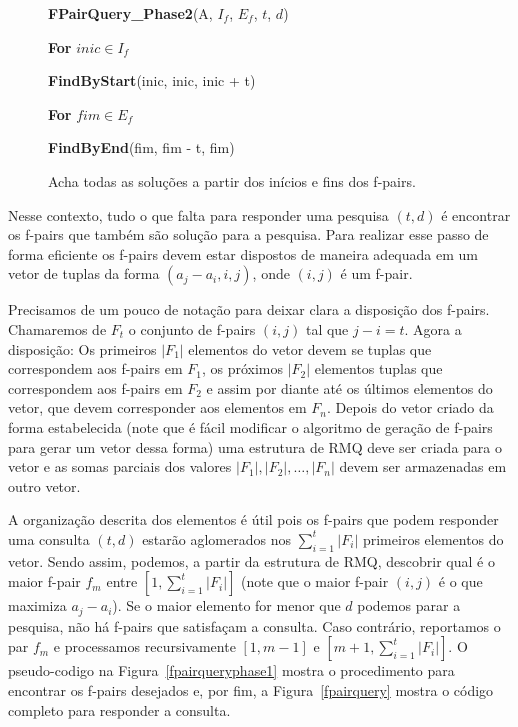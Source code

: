 \documentclass[12pt]{article}
\begin{document}
\begin{figure}
\begin{framed}
{\bf FPairQuery\_Phase2}(A, $I_f$, $E_f$, $t$, $d$)

\hspace{1cm} {\bf For} $inic \in I_f$

\hspace{2cm} {\bf FindByStart}(inic, inic, inic + t)

\hspace{1cm} {\bf For} $fim \in E_f$

\hspace{2cm} {\bf FindByEnd}(fim, fim - t, fim)

\end{framed}
\caption{Acha todas as soluções a partir dos inícios e fins dos f-pairs.}
\label{fpairqueryphase2}
\end{figure}


Nesse contexto, tudo o que falta para responder uma pesquisa $(t,d)$
é encontrar os f-pairs que também são solução para a pesquisa. 
Para realizar esse passo de forma eficiente os f-pairs devem
estar dispostos de maneira adequada em um vetor de tuplas da forma $(a_j - a_i, i, j)$,
onde $(i, j)$ é um f-pair.

Precisamos de um pouco de notação para deixar clara a disposição dos f-pairs.
Chamaremos de $F_t$ o conjunto de f-pairs $(i, j)$ tal que $j - i = t$. Agora 
a disposição: Os primeiros $|F_1|$ elementos do vetor devem se tuplas que correspondem aos f-pairs em $F_1$,
os próximos $|F_2|$ elementos tuplas que correspondem aos f-pairs em $F_2$ e assim por diante 
até os últimos elementos do vetor, que devem corresponder aos elementos em $F_n$.
Depois do vetor criado da forma estabelecida (note que é fácil modificar o 
algoritmo de geração de f-pairs para gerar um vetor dessa forma) uma estrutura de
RMQ deve ser criada para o vetor e as somas parciais dos valores $|F_1|, |F_2|, \ldots, |F_n|$
devem ser armazenadas em outro vetor. 

A organização descrita dos elementos é útil pois os f-pairs que podem responder uma consulta $(t,d)$ 
estarão aglomerados nos $\sum_{i = 1}^t |F_i|$ primeiros elementos do vetor. Sendo assim,
podemos, a partir da estrutura de RMQ, descobrir qual é o maior f-pair
$f_m$ entre $[1, \sum_{i = 1}^t |F_i|]$ (note que o maior f-pair $(i, j)$ é o que maximiza $a_j - a_i$).
Se o maior elemento for menor que $d$ podemos parar a pesquisa, não há f-pairs que satisfaçam a consulta. Caso contrário, reportamos
o par $f_m$ e processamos recursivamente $[1, m - 1]$ e $[m + 1, \sum_{i=1}^t |F_i|]$.
O pseudo-codigo na Figura~\ref{fpairqueryphase1} mostra o procedimento para encontrar
os f-pairs desejados e, por fim, a Figura~\ref{fpairquery} mostra o código completo
para responder a consulta.
\end{document}
